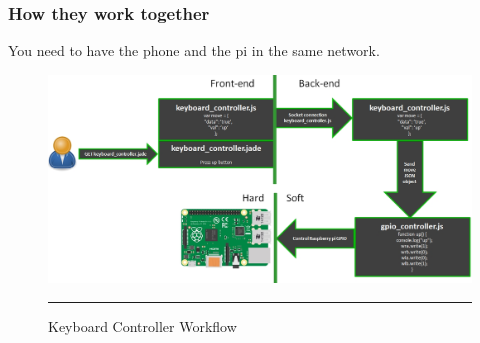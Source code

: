 \subsubsection{How they work together}
You need to have the phone and the pi in the same network.

\begin{figure}[h!]
  \centering
    \includegraphics[width=1\textwidth]{./Pictures/controller_workflow.jpg}
  \rule{1\textwidth}{1pt}
 \caption{Keyboard Controller Workflow}
 \label{fig:keyboard_controller}
\end{figure}